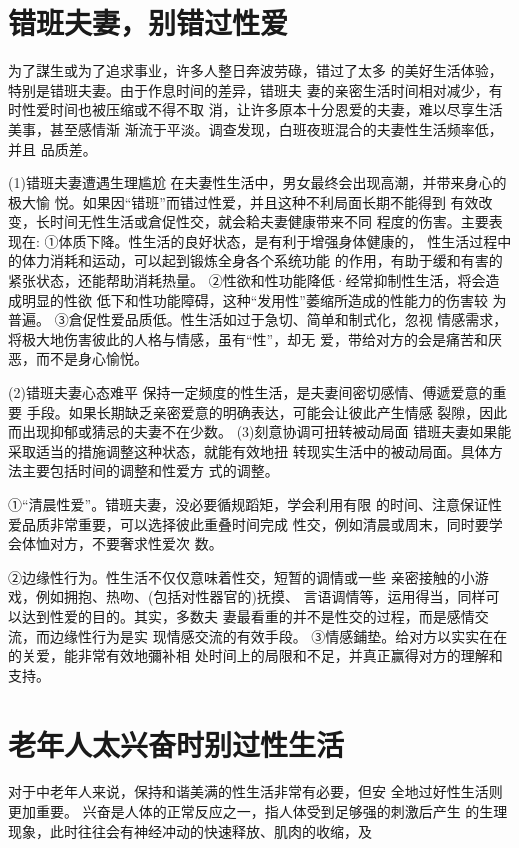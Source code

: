 \documentclass[12pt,UTF8]{ctexbook}
\begin{document}
\section{错班夫妻，别错过性爱}

为了謀生或为了追求事业，许多人整日奔波劳碌，错过了太多
的美好生活体验，特别是错班夫妻。由于作息时间的差异，错班夫
妻的亲密生活时间相对减少，有时性爱时间也被压缩或不得不取
消，让许多原本十分恩爱的夫妻，难以尽享生活美事，甚至感情渐
渐流于平淡。调查发现，白班夜班混合的夫妻性生活频率低，并且
品质差。

(1)错班夫妻遭遇生理尴尬
在夫妻性生活中，男女最终会出现高潮，并带来身心的极大愉
悦。如果因“错班”而错过性爱，并且这种不利局面长期不能得到
有效改变，长时间无性生活或倉促性交，就会耠夫妻健康带来不同
程度的伤害。主要表现在:
①体质下降。性生活的良好状态，是有利于增强身体健康的，
性生活过程中的体力消耗和运动，可以起到锻炼全身各个系统功能
的作用，有助于缓和有害的紧张状态，还能帮助消耗热量。
②性欲和性功能降低·经常抑制性生活，将会造成明显的性欲
低下和性功能障碍，这种“发用性”萎缩所造成的性能力的伤害较
为普遍。
③倉促性爱品质低。性生活如过于急切、简单和制式化，忽视
情感需求，将极大地伤害彼此的人格与情感，虽有“性”，却无
爱，带给对方的会是痛苦和厌恶，而不是身心愉悦。

(2)错班夫妻心态难平
保持一定频度的性生活，是夫妻间密切感情、傅遞爱意的重要
手段。如果长期缺乏亲密爱意的明确表达，可能会让彼此产生情感
裂隙，因此而出现抑郁或猜忌的夫妻不在少数。
(3)刻意协调可扭转被动局面
错班夫妻如果能采取适当的措施调整这种状态，就能有效地扭
转现实生活中的被动局面。具体方法主要包括时间的调整和性爱方
式的调整。

①“清晨性爱”。错班夫妻，没必要循规蹈矩，学会利用有限
的时间、注意保证性爱品质非常重要，可以选择彼此重叠时间完成
性交，例如清晨或周末，同时要学会体恤对方，不要奢求性爱次
数。

②边缘性行为。性生活不仅仅意味着性交，短暂的调情或一些
亲密接触的小游戏，例如拥抱、热吻、(包括对性器官的)抚摸、
言语调情等，运用得当，同样可以达到性爱的目的。其实，多数夫
妻最看重的并不是性交的过程，而是感情交流，而边缘性行为是实
现情感交流的有效手段。
③情感鋪垫。给对方以实实在在的关爱，能非常有效地彌补相
处时间上的局限和不足，并真正赢得对方的理解和支持。


\section{老年人太兴奋时别过性生活}

对于中老年人来说，保持和谐美满的性生活非常有必要，但安
全地过好性生活则更加重要。
兴奋是人体的正常反应之一，指人体受到足够强的刺激后产生
的生理现象，此时往往会有神经冲动的快速释放、肌肉的收缩，及
\end{document}
